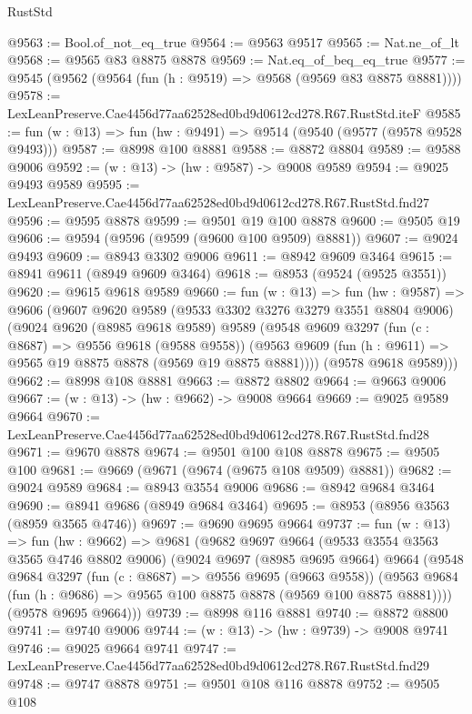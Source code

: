 \begin{lexlean}{RustStd}
\begin{coremodule}
@9563 := Bool.of_not_eq_true
@9564 := @9563 @9517
@9565 := Nat.ne_of_lt
@9568 := @9565 @83 @8875 @8878
@9569 := Nat.eq_of_beq_eq_true
@9577 := @9545 (@9562 (@9564 (fun (h : @9519) => @9568 (@9569 @83 @8875 @8881))))
@9578 := LexLeanPreserve.Cae4456d77aa62528ed0bd9d0612cd278.R67.RustStd.iteF
@9585 := fun (w : @13) => fun (hw : @9491) => @9514 (@9540 (@9577 (@9578 @9528 @9493)))
@9587 := @8998 @100 @8881
@9588 := @8872 @8804
@9589 := @9588 @9006
@9592 := (w : @13) -> (hw : @9587) -> @9008 @9589
@9594 := @9025 @9493 @9589
@9595 := LexLeanPreserve.Cae4456d77aa62528ed0bd9d0612cd278.R67.RustStd.fnd27
@9596 := @9595 @8878
@9599 := @9501 @19 @100 @8878
@9600 := @9505 @19
@9606 := @9594 (@9596 (@9599 (@9600 @100 @9509) @8881))
@9607 := @9024 @9493
@9609 := @8943 @3302 @9006
@9611 := @8942 @9609 @3464
@9615 := @8941 @9611 (@8949 @9609 @3464)
@9618 := @8953 (@9524 (@9525 @3551))
@9620 := @9615 @9618 @9589
@9660 := fun (w : @13) =>
  fun (hw : @9587) =>
  @9606
    (@9607
      @9620
      @9589
      (@9533 @3302 @3276 @3279 @3551 @8804 @9006)
      (@9024
        @9620
        (@8985 @9618 @9589)
        @9589
        (@9548
          @9609
          @3297
          (fun (c : @8687) => @9556 @9618 (@9588 @9558))
          (@9563 @9609 (fun (h : @9611) => @9565 @19 @8875 @8878 (@9569 @19 @8875 @8881))))
        (@9578 @9618 @9589)))
@9662 := @8998 @108 @8881
@9663 := @8872 @8802
@9664 := @9663 @9006
@9667 := (w : @13) -> (hw : @9662) -> @9008 @9664
@9669 := @9025 @9589 @9664
@9670 := LexLeanPreserve.Cae4456d77aa62528ed0bd9d0612cd278.R67.RustStd.fnd28
@9671 := @9670 @8878
@9674 := @9501 @100 @108 @8878
@9675 := @9505 @100
@9681 := @9669 (@9671 (@9674 (@9675 @108 @9509) @8881))
@9682 := @9024 @9589
@9684 := @8943 @3554 @9006
@9686 := @8942 @9684 @3464
@9690 := @8941 @9686 (@8949 @9684 @3464)
@9695 := @8953 (@8956 @3563 (@8959 @3565 @4746))
@9697 := @9690 @9695 @9664
@9737 := fun (w : @13) =>
  fun (hw : @9662) =>
  @9681
    (@9682
      @9697
      @9664
      (@9533 @3554 @3563 @3565 @4746 @8802 @9006)
      (@9024
        @9697
        (@8985 @9695 @9664)
        @9664
        (@9548
          @9684
          @3297
          (fun (c : @8687) => @9556 @9695 (@9663 @9558))
          (@9563 @9684 (fun (h : @9686) => @9565 @100 @8875 @8878 (@9569 @100 @8875 @8881))))
        (@9578 @9695 @9664)))
@9739 := @8998 @116 @8881
@9740 := @8872 @8800
@9741 := @9740 @9006
@9744 := (w : @13) -> (hw : @9739) -> @9008 @9741
@9746 := @9025 @9664 @9741
@9747 := LexLeanPreserve.Cae4456d77aa62528ed0bd9d0612cd278.R67.RustStd.fnd29
@9748 := @9747 @8878
@9751 := @9501 @108 @116 @8878
@9752 := @9505 @108

\end{coremodule}
\end{lexlean}
